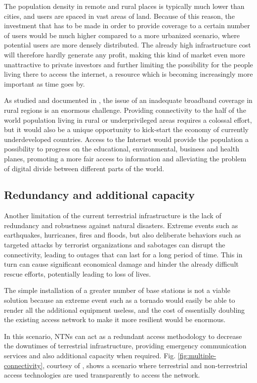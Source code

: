 The population density in remote and rural places is typically much lower than cities, and users are spaced in vast areas of land. Because of this reason, the investment that has to be made in order to provide coverage to a certain number of users would be much higher compared to a more urbanized scenario, where potential users are more densely distributed. The already high infrastructure cost will therefore hardly generate any profit, making this kind of market even more unattractive to private investors and further limiting the possibility for the people living there to access the internet, a resource which is becoming increasingly more important as time goes by.

As studied and documented in \cite{6g-challenge-opportunity-base-pyramid}, the issue of an inadequate broadband coverage in rural regions is an enormous challenge. Providing connectivity to the half of the world population living in rural or underprivileged areas requires a colossal effort, but it would also be a unique opportunity to kick-start the economy of currently underdeveloped countries. Access to the Internet would provide the population a possibility to progress on the educational, environmental, business and health planes, promoting a more fair access to information and alleviating the problem of digital divide between different parts of the world.

\subsection{Redundancy and additional capacity}
Another limitation of the current terrestrial infrastructure is the lack of redundancy and robustness against natural disasters. Extreme events such as earthquakes, hurricanes, fires and floods, but also deliberate behaviors such as targeted attacks by terrorist organizations and sabotages can disrupt the connectivity, leading to outages that can last for a long period of time. This in turn can cause significant economical damage and hinder the already difficult rescue efforts, potentially leading to loss of lives.

The simple installation of a greater number of base stations is not a viable solution because an extreme event such as a tornado would easily be able to render all the additional equipment useless, and the cost of essentially doubling the existing access network to make it more resilient would be enormous.

In this scenario, \ac{NTNs} can act as a redundant access methodology to decrease the downtimes of terrestrial infrastructure, providing emergency communication services and also additional capacity when required. 
Fig. \ref{fig:multiple-connectivity}, courtesy of \cite{3gpp-tr-38.811}, shows a scenario where terrestrial and non-terrestrial access technologies are used transparently to access the network. 

